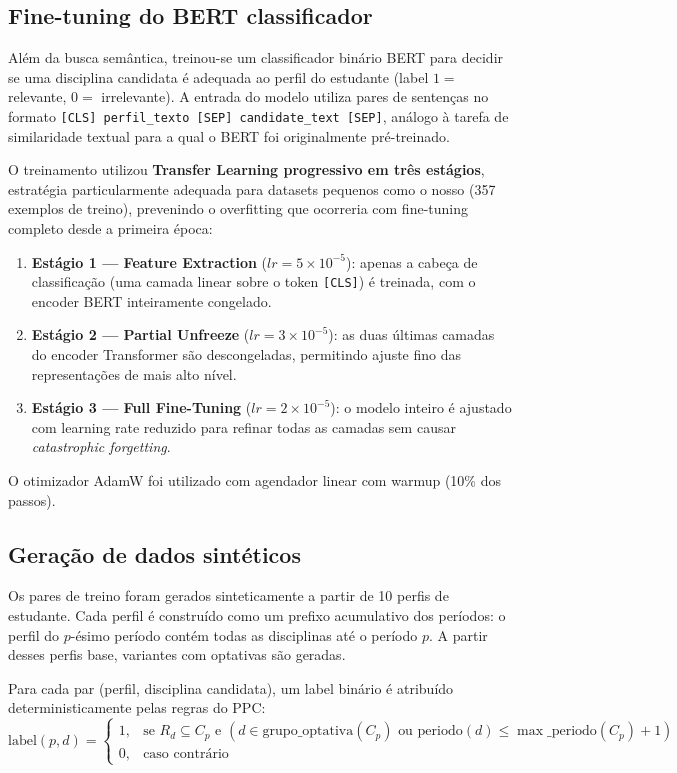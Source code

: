 \documentclass[12pt,a4paper]{article}
\begin{document}
\subsection{Fine-tuning do BERT classificador}

Além da busca semântica, treinou-se um classificador binário BERT para decidir se uma disciplina candidata é adequada ao perfil do estudante (label $1 =$ relevante, $0 =$ irrelevante). A entrada do modelo utiliza pares de sentenças no formato \texttt{[CLS] perfil\_texto [SEP] candidate\_text [SEP]}, análogo à tarefa de similaridade textual para a qual o BERT foi originalmente pré-treinado.

O treinamento utilizou \textbf{Transfer Learning progressivo em três estágios}, estratégia particularmente adequada para datasets pequenos como o nosso (357 exemplos de treino), prevenindo o overfitting que ocorreria com fine-tuning completo desde a primeira época:

\begin{enumerate}
    \item \textbf{Estágio 1 — Feature Extraction} ($lr = 5\times10^{-5}$): apenas a cabeça de classificação (uma camada linear sobre o token \texttt{[CLS]}) é treinada, com o encoder BERT inteiramente congelado.
    \item \textbf{Estágio 2 — Partial Unfreeze} ($lr = 3\times10^{-5}$): as duas últimas camadas do encoder Transformer são descongeladas, permitindo ajuste fino das representações de mais alto nível.
    \item \textbf{Estágio 3 — Full Fine-Tuning} ($lr = 2\times10^{-5}$): o modelo inteiro é ajustado com learning rate reduzido para refinar todas as camadas sem causar \textit{catastrophic forgetting}.
\end{enumerate}

O otimizador AdamW foi utilizado com agendador linear com warmup (10\% dos passos).

\subsection{Geração de dados sintéticos}

Os pares de treino foram gerados sinteticamente a partir de 10 perfis de estudante. Cada perfil é construído como um prefixo acumulativo dos períodos: o perfil do $p$-ésimo período contém todas as disciplinas até o período $p$. A partir desses perfis base, variantes com optativas são geradas.

Para cada par (perfil, disciplina candidata), um label binário é atribuído deterministicamente pelas regras do PPC:
\begin{equation}
    \text{label}(p, d) =
    \begin{cases}
        1, & \text{se } R_d \subseteq C_p \text{ e } (d \in \text{grupo\_optativa}(C_p) \text{ ou } \text{periodo}(d) \leq \max\_\text{periodo}(C_p) + 1)\\
        0, & \text{caso contrário}
    \end{cases}
\end{equation}
\end{document}

